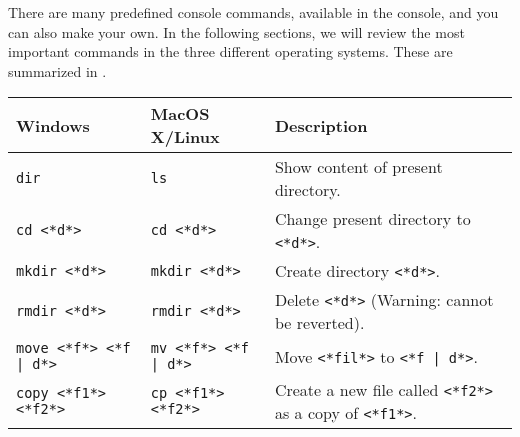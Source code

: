 \documentclass[springer.tex]{subfiles}
\begin{document}
There are many predefined console commands, available in the console, and you can also make your own. In the following sections, we will review the most important commands in the three different operating systems. These are summarized in .
\begin{table}
  \centering
  \begin{tabularx}{\linewidth}{|l|l|>{\raggedright\arraybackslash}X|}
    \hline
    Windows & MacOS X/Linux & Description 
    \\ \hline\hline
    {\lstinline[language=syntax]!dir!}
            & {\lstinline[language=syntax]!ls!}
                            & Show content of present directory.
    \\ \hline
    {\lstinline[language=syntax]!cd <*d*>!} 
            &{\lstinline[language=syntax]!cd <*d*>!} 
                          & Change present directory to {\lstinline[language=syntax]!<*d*>!}. 
    \\ \hline
    {\lstinline[language=syntax]!mkdir <*d*>!}
            & {\lstinline[language=syntax]!mkdir <*d*>!}
                          & Create directory {\lstinline[language=syntax]!<*d*>!}. \\ \hline
    {\lstinline[language=syntax]!rmdir <*d*>!}
            & {\lstinline[language=syntax]!rmdir <*d*>!}
                          & Delete {\lstinline[language=syntax]!<*d*>!} (Warning: cannot be reverted). \\ \hline
    {\lstinline[language=syntax, keywords={}]!move <*f*> <*f | d*>!\hspace*{5mm}}%
            &{\lstinline[language=syntax, keywords={}]!mv <*f*> <*f | d*>!}
                          & Move {\lstinline[language=syntax]!<*fil*>!} to {\lstinline[language=syntax, keywords={}]!<*f | d*>!}. \\ \hline
    {\lstinline[language=syntax]!copy <*f1*> <*f2*>!}
            &{\lstinline[language=syntax]!cp <*f1*> <*f2*>!}
             & Create a new file called {\lstinline[language=syntax]!<*f2*>!} as a copy of {\lstinline[language=syntax]!<*f1*>!}. \\ \hline

\end{tabularx}
\end{table}
\end{document}
